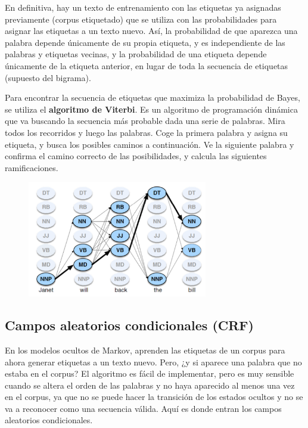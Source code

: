 En definitiva, hay un texto de entrenamiento con las etiquetas ya asignadas previamente (corpus etiquetado) que se utiliza con las probabilidades para asignar las etiquetas a un texto nuevo. Así, la probabilidad de que aparezca una palabra depende únicamente de su propia etiqueta, y es independiente de las palabras y etiquetas vecinas, y la probabilidad de una etiqueta depende únicamente de la etiqueta anterior, en lugar de toda la secuencia de etiquetas (supuesto del bigrama).

Para encontrar la secuencia de etiquetas que maximiza la probabilidad de Bayes, se utiliza el \textbf{algoritmo de Viterbi}. Es un algoritmo de programación dinámica que va buscando la secuencia más probable dada una serie de palabras. Mira todos los recorridos y luego las palabras. Coge la primera palabra y asigna su etiqueta, y busca los posibles caminos a continuación. Ve la siguiente palabra y confirma el camino correcto de las posibilidades, y calcula las siguientes ramificaciones. 

\begin{figure}[h]
\centering
\includegraphics[width = 0.7\textwidth]{figs/viterbi.png}
\end{figure}

\subsection{Campos aleatorios condicionales (CRF)}
En los modelos ocultos de Markov, aprenden las etiquetas de un corpus para ahora generar etiquetas a un texto nuevo. Pero, ¿y si aparece una palabra que no estaba en el corpus? El algoritmo es fácil de implementar, pero es muy sensible cuando se altera el orden de las palabras y no haya aparecido al menos una vez en el corpus, ya que no se puede hacer la transición de los estados ocultos y no se va a reconocer como una secuencia válida. Aquí es donde entran los campos aleatorios condicionales.

